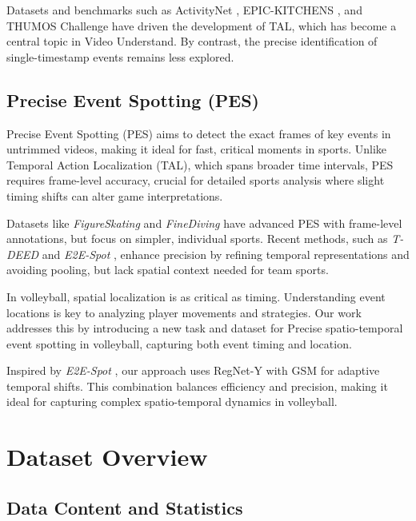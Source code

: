 \documentclass[conference]{IEEEtran}
\begin{document}
Datasets and benchmarks such as ActivityNet \cite{ActivityNet}, EPIC-KITCHENS \cite{damen2018scalingegocentricvisionepickitchens}, and THUMOS Challenge \cite{Idrees_2017} have driven the development of TAL, which has become a central topic in Video Understand. By contrast, the precise identification of single-timestamp events remains less explored.

\subsection{Precise Event Spotting (PES)}

Precise Event Spotting (PES) aims to detect the exact frames of key events in untrimmed videos, making it ideal for fast, critical moments in sports. Unlike Temporal Action Localization (TAL), which spans broader time intervals, PES requires frame-level accuracy, crucial for detailed sports analysis where slight timing shifts can alter game interpretations.

Datasets like \textit{FigureSkating} \cite{figureskating} and \textit{FineDiving} \cite{finediving} have advanced PES with frame-level annotations, but focus on simpler, individual sports. Recent methods, such as \textit{T-DEED} \cite{tdeed23} and \textit{E2E-Spot} \cite{spot22}, enhance precision by refining temporal representations and avoiding pooling, but lack spatial context needed for team sports.

In volleyball, spatial localization is as critical as timing. Understanding event locations is key to analyzing player movements and strategies. Our work addresses this by introducing a new task and dataset for Precise spatio-temporal event spotting in volleyball, capturing both event timing and location.

Inspired by \textit{E2E-Spot} \cite{spot22}, our approach uses RegNet-Y \cite{radosavovic2020designingnetworkdesignspaces} with GSM \cite{9156729} for adaptive temporal shifts. This combination balances efficiency and precision, making it ideal for capturing complex spatio-temporal dynamics in volleyball.

\section{Dataset Overview}

\subsection{Data Content and Statistics}
\end{document}
